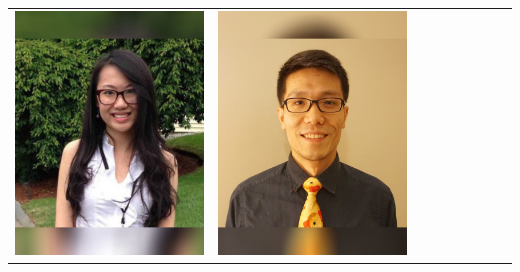 \documentclass[landscape,a0paper,fontscale=0.292]{baposter}
\begin{document}
\begin{poster}
{\begin{center}
\begin{tabularx}{\linewidth}{X X X X X X X X X}
{\centering \includegraphics[width=0.65\linewidth]{kwan.jpg}}&
{\centering \includegraphics[width=0.65\linewidth]{liu.jpg}}&

\end{tabularx}
\end{center}}
\end{poster}
\end{document}
